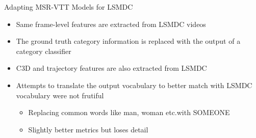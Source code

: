 \documentclass{beamer}
\begin{document}
\begin{frame}{Adapting MSR-VTT Models for LSMDC}
    \begin{itemize}
        \item Same frame-level features are extracted from LSMDC videos
        \item The ground truth category information is replaced with the output of a category classifier
        \item C3D and trajectory features are also extracted from LSMDC
        \item Attempts to translate the output vocabulary to better match with LSMDC vocabulary were not frutiful
           \begin{itemize}
               \item Replacing common words like man, woman etc.\@ with SOMEONE
               \item Slightly better metrics but loses detail
           \end{itemize}
    \end{itemize}
\end{frame}
\end{document}
